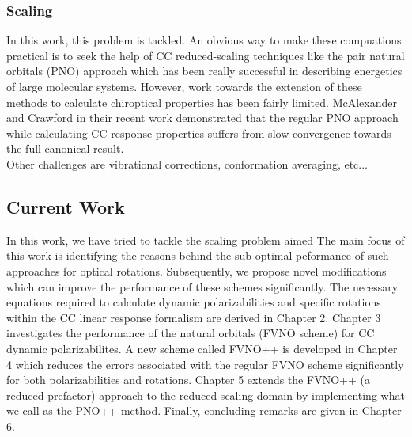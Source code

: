 \subsubsection{Scaling}
In this work, this problem is tackled.
An obvious way to make these compuations practical is to seek the help of CC reduced-scaling 
techniques like the pair natural orbitals (PNO) approach\cite{NeeseCCSD09,Neese09} which has been really successful in describing energetics of 
large molecular systems. However, work towards the extension of these methods to calculate chiroptical properties has been 
fairly limited\cite{Friedrich15,Gauss00,Korona04,McAlexander12,Russ04,Russ08}. McAlexander and Crawford in their recent 
work\cite{McAlexander15:LRCC} demonstrated that the regular PNO approach while calculating CC response properties 
suffers from slow convergence towards the full canonical result. \\
Other challenges are vibrational corrections, conformation averaging, etc...\\
\subsection{Current Work}
In this work, we have tried to tackle the scaling problem aimed
The main focus of this work is identifying the 
reasons behind the sub-optimal peformance of such approaches for optical rotations. Subsequently, we propose novel modifications
which can improve the performance of these schemes significantly. The necessary equations required to calculate dynamic polarizabilities and specific rotations within the CC linear response formalism are derived in Chapter 2. %
Chapter 3 investigates the performance of the natural orbitals (FVNO scheme) for CC dynamic polarizabilites.
A new scheme called FVNO++ is developed in Chapter 4 which reduces the errors associated with the regular FVNO scheme
significantly for both polarizabilities and rotations. Chapter 5 extends the FVNO++ (a reduced-prefactor) approach to the reduced-scaling 
domain by implementing what we call as the PNO++ method. Finally, concluding remarks are given in Chapter 6.
